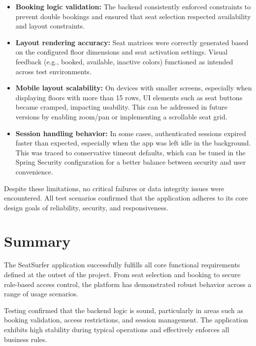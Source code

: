 \documentclass[12pt,a4paper]{report} %
\begin{document}
\begin{itemize}
    \item \textbf{Booking logic validation:} The backend consistently enforced constraints to prevent double bookings and ensured that seat selection respected availability and layout constraints.
    
    \item \textbf{Layout rendering accuracy:} Seat matrices were correctly generated based on the configured floor dimensions and seat activation settings. Visual feedback (e.g., booked, available, inactive colors) functioned as intended across test environments.

    \item \textbf{Mobile layout scalability:} On devices with smaller screens, especially when displaying floors with more than 15 rows, UI elements such as seat buttons became cramped, impacting usability. This can be addressed in future versions by enabling zoom/pan or implementing a scrollable seat grid.

    \item \textbf{Session handling behavior:} In some cases, authenticated sessions expired faster than expected, especially when the app was left idle in the background. This was traced to conservative timeout defaults, which can be tuned in the Spring Security configuration for a better balance between security and user convenience.
\end{itemize}

Despite these limitations, no critical failures or data integrity issues were encountered. All test scenarios confirmed that the application adheres to its core design goals of reliability, security, and responsiveness.

\section{Summary}

The SeatSurfer application successfully fulfills all core functional requirements defined at the outset of the project. From seat selection and booking to secure role-based access control, the platform has demonstrated robust behavior across a range of usage scenarios.

Testing confirmed that the backend logic is sound, particularly in areas such as booking validation, access restrictions, and session management. The application exhibits high stability during typical operations and effectively enforces all business rules.
\end{document}
